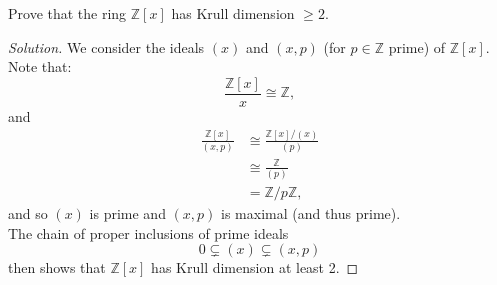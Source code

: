 \documentclass[12pt]{article}
\newenvironment{problem}[2][Problem]{\begin{trivlist}
\item[\hskip \labelsep {\bfseries #1}\hskip \labelsep {\bfseries #2.}]}{\end{trivlist}}
\newenvironment{solution}
  {\renewcommand\qedsymbol{$\blacksquare$}\begin{proof}[Solution]}
{\end{proof}}
\theoremstyle{remark}
\begin{document}
\begin{problem}{4.24}
  Prove that the ring $\mathbb{Z}[x]$ has Krull dimension $\geq2$.
\end{problem}
\begin{solution}
  We consider the ideals $(x)$ and $(x,p)$ (for $p\in\mathbb{Z}$ prime)
  of $\mathbb{Z}[x]$.
  Note that:
  \begin{equation*}
    \frac{\mathbb{Z}[x]}{x}\cong\mathbb{Z},
  \end{equation*}
  and
  \begin{align*}
    \frac{\mathbb{Z}[x]}{(x,p)} &\cong \frac{\mathbb{Z}[x]/(x)}{(p)} \\
    &\cong\frac{\mathbb{Z}}{(p)} \\
    &= \mathbb{Z}/p\mathbb{Z},
  \end{align*}
  and so $(x)$ is prime and $(x,p)$ is maximal (and thus prime). \\
  \indent The chain of proper inclusions of prime ideals
  \begin{equation*}
    0\subsetneq (x)\subsetneq (x,p)
  \end{equation*}
  then shows that $\mathbb{Z}[x]$ has Krull dimension at least 2.
\end{solution}
\end{document}
